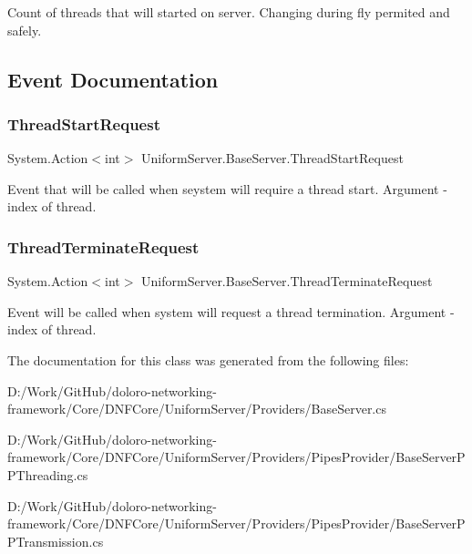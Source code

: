 Count of threads that will started on server. Changing during fly permited and safely. 



\subsection{Event Documentation}
\mbox{\label{class_uniform_server_1_1_base_server_a440a854a955ab7c5e563918c12e9b32c}} 
\subsubsection{\texorpdfstring{Thread\+Start\+Request}{ThreadStartRequest}}
{\footnotesize\ttfamily System.\+Action$<$int$>$ Uniform\+Server.\+Base\+Server.\+Thread\+Start\+Request\hspace{0.3cm}{\ttfamily [static]}}



Event that will be called when seystem will require a thread start. Argument -\/ index of thread. 

\mbox{\label{class_uniform_server_1_1_base_server_a889c3aaa1cca7f4a9a4e32617516f4be}} 
\subsubsection{\texorpdfstring{Thread\+Terminate\+Request}{ThreadTerminateRequest}}
{\footnotesize\ttfamily System.\+Action$<$int$>$ Uniform\+Server.\+Base\+Server.\+Thread\+Terminate\+Request\hspace{0.3cm}{\ttfamily [static]}}



Event will be called when system will request a thread termination. Argument -\/ index of thread. 



The documentation for this class was generated from the following files\+:\begin{DoxyCompactItemize}
\item 
D\+:/\+Work/\+Git\+Hub/doloro-\/networking-\/framework/\+Core/\+D\+N\+F\+Core/\+Uniform\+Server/\+Providers/Base\+Server.\+cs\item 
D\+:/\+Work/\+Git\+Hub/doloro-\/networking-\/framework/\+Core/\+D\+N\+F\+Core/\+Uniform\+Server/\+Providers/\+Pipes\+Provider/Base\+Server\+P\+P\+Threading.\+cs\item 
D\+:/\+Work/\+Git\+Hub/doloro-\/networking-\/framework/\+Core/\+D\+N\+F\+Core/\+Uniform\+Server/\+Providers/\+Pipes\+Provider/Base\+Server\+P\+P\+Transmission.\+cs\end{DoxyCompactItemize}
